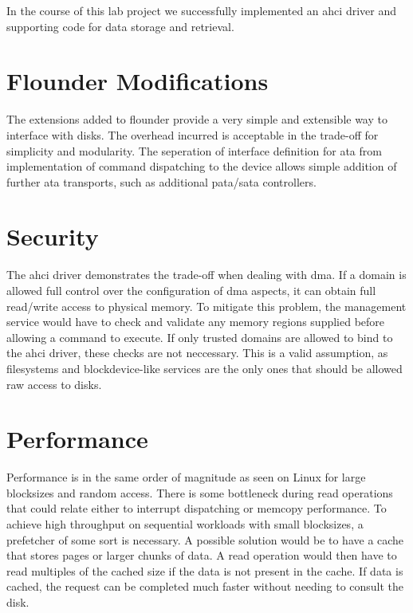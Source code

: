 In the course of this lab project we successfully implemented an \ac{ahci}
driver and supporting code for data storage and retrieval.

\section{Flounder Modifications}

The extensions added to flounder provide a very simple and extensible way to
interface with disks. The overhead incurred is acceptable in the trade-off for
simplicity and modularity. The seperation of interface definition for \ac{ata}
from implementation of command dispatching to the device allows simple addition
of further \ac{ata} transports, such as additional \acs{pata}/\acs{sata}
controllers.

\section{Security}

The \acs{ahci} driver demonstrates the trade-off when dealing with \acs{dma}.
If a domain is allowed full control over the configuration of \acs{dma}
aspects, it can obtain full read/write access to physical memory. To mitigate
this problem, the management service would have to check and validate any
memory regions supplied before allowing a command to execute. If only trusted
domains are allowed to bind to the \acs{ahci} driver, these checks are not
neccessary. This is a valid assumption, as filesystems and blockdevice-like
services are the only ones that should be allowed raw access to disks.

\section{Performance}

Performance is in the same order of magnitude as seen on Linux for large
blocksizes and random access. There is some bottleneck during read operations
that could relate either to interrupt dispatching or memcopy performance.  To
achieve high throughput on sequential workloads with small blocksizes, a
prefetcher of some sort is necessary. A possible solution would be to have a
cache that stores pages or larger chunks of data. A read operation would then
have to read multiples of the cached size if the data is not present in the
cache. If data is cached, the request can be completed much faster without
needing to consult the disk.
